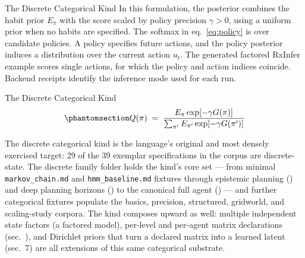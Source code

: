 \documentclass[
  ignorenonframetext,
]{beamer}
\begin{document}
\begin{frame}{The Discrete Categorical Kind}
In this formulation, the posterior combines the habit prior \(E_\pi\)
with the score scaled by policy precision \(\gamma>0\), using a uniform
prior when no habits are specified. The softmax in eq.~\ref{eq:policy}
is over candidate policies. A policy specifies future actions, and the
policy posterior induces a distribution over the current action \(u_t\).
The generated factored RxInfer example scores single actions, for which
the policy and action indices coincide. Backend receipts identify the
inference mode used for each run.

\end{frame}

\begin{frame}{The Discrete Categorical Kind}
\begin{equation}\protect\phantomsection\label{eq:policy}{Q(\pi) \;=\; \frac{E_\pi \exp\!\left[-\gamma G(\pi)\right]}{\sum_{\pi'} E_{\pi'} \exp\!\left[-\gamma G(\pi')\right]}}\end{equation}

The discrete categorical kind is the language's original and most
densely exercised target: 29 of the 39 exemplar specifications in the
corpus are discrete-state. The discrete family folder holds the kind's
core set --- from minimal \texttt{markov\_chain.md} and
\texttt{hmm\_baseline.md} fixtures through epistemic planning
() and deep planning horizons
() to the canonical full agent
() --- and further categorical fixtures
populate the basics, precision, structured, gridworld, and scaling-study
corpora. The kind composes upward as well: multiple independent state
factors (a factored model), per-level and per-agent matrix declarations
(sec.~), and Dirichlet priors that turn a
declared matrix into a learned latent
(sec.~7) are all extensions of this same
categorical substrate.
\end{frame}
\end{document}
